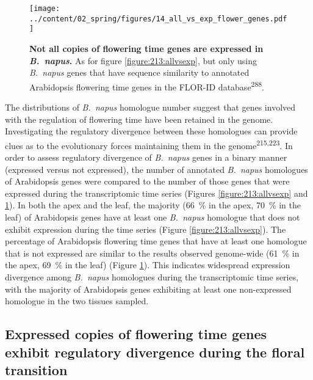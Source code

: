 \documentclass[12pt,]{book}
\begin{document}
\begin{figure}[htbp]
\centering
\texttt{[image: ../content/02\_spring/figures/14\_all\_vs\_exp\_flower\_genes.pdf]}
\caption{\textbf{Not all copies of flowering time genes are expressed in
\emph{B.~napus}.} As for figure \ref{figure:213:allvsexp}, but only
using \emph{B.~napus} genes that have sequence similarity to annotated
Arabidopsis flowering time genes in the FLOR-ID
database\textsuperscript{288}.}\label{figure:214:allvsexpflower}
\end{figure}

The distributions of \emph{B.~napus} homologue number suggest that genes
involved with the regulation of flowering time have been retained in the
genome. Investigating the regulatory divergence between these homologues
can provide clues as to the evolutionary forces maintaining them in the
genome\textsuperscript{215,223}. In order to assess regulatory
divergence of \emph{B.~napus} genes in a binary manner (expressed versus
not expressed), the number of annotated \emph{B.~napus} homologues of
Arabidopsis genes were compared to the number of those genes that were
expressed during the transcriptomic time series (Figures
\ref{figure:213:allvsexp} and \ref{figure:214:allvsexpflower}). In both
the apex and the leaf, the majority (66~\% in the apex, 70~\% in the
leaf) of Arabidopsis genes have at least one \emph{B.~napus} homologue
that does not exhibit expression during the time series (Figure
\ref{figure:213:allvsexp}). The percentage of Arabidopsis flowering time
genes that have at least one homologue that is not expressed are similar
to the results observed genome-wide (61~\% in the apex, 69~\% in the
leaf) (Figure \ref{figure:214:allvsexpflower}). This indicates
widespread expression divergence among \emph{B.~napus} homologues during
the transcriptomic time series, with the majority of Arabidopsis genes
exhibiting at least one non-expressed homologue in the two tissues
sampled.

\subsection{Expressed copies of flowering time genes exhibit regulatory
divergence during the floral
transition}\label{section:spring:divergence}
\end{document}
